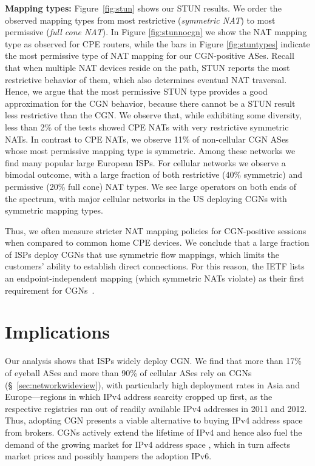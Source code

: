 \documentclass[10pt]{sig-alternate-05-2015}
\newcommand\xref[1]{\S~\ref{#1}}
\newcommand{\parax}[1]{\vspace{0.2em} \noindent \textbf{#1:}}
\begin{document}
\parax{Mapping types}
Figure~\ref{fig:stun} shows our STUN results. We order the observed 
mapping types from most restrictive (\textit{symmetric NAT}) to most permissive 
(\textit{full cone NAT}).
In Figure \ref{fig:stunnocgn} we show the NAT mapping type as observed
for CPE routers, while the bars in Figure \ref{fig:stuntypes} indicate
the most permissive type of NAT mapping for our CGN-positive ASes.
Recall that when multiple NAT devices reside on the path, STUN reports the most restrictive behavior of them, which also determines 
eventual NAT traversal. Hence, we argue that the most permissive STUN type 
provides a good approximation for the CGN behavior, 
because there cannot be a STUN result less restrictive than the CGN. 
We observe that, while exhibiting some diversity, less than 2\% 
of the tests showed CPE NATs with very 
restrictive symmetric NATs. In contrast to CPE NATs, we observe 
11\%{} of non-cellular CGN ASes whose most permissive 
mapping type is symmetric. Among these networks we find many 
popular large European ISPs.
For cellular networks we observe a bimodal outcome, with a 
large fraction of both restrictive (40\%{} 
symmetric) and permissive (20\%{} full cone) NAT 
types. We see large operators on both ends of the spectrum, with major cellular 
networks in the US deploying CGNs with symmetric mapping types.

 


Thus, we often measure stricter NAT mapping policies for CGN-positive sessions 
when compared to common home CPE devices. We conclude that a large fraction of 
ISPs deploy CGNs that use symmetric flow mappings, which limits the customers' 
ability to establish direct connections. For this reason, the IETF lists an 
endpoint-independent mapping (which symmetric NATs violate) as their first 
requirement for CGNs~\cite{rfc4787,rfc5382}.

\section{Implications} 



Our analysis shows that ISPs widely deploy CGN. We find that more than 17\% 
of eyeball ASes and more than 90\% of cellular ASes rely on CGNs 
(\xref{sec:networkwideview}), with particularly high deployment rates in Asia 
and Europe---regions in which IPv4 address scarcity cropped up first, as the 
respective registries ran out of readily available IPv4 addresses in 2011 and 
2012. Thus, adopting CGN presents
a viable alternative to buying IPv4 address space from brokers.
CGNs actively extend the lifetime of IPv4 and hence also fuel the 
demand of the growing market for IPv4 address space \cite{RABP14}, which in 
turn affects market prices and possibly hampers the adoption IPv6.
\end{document}
